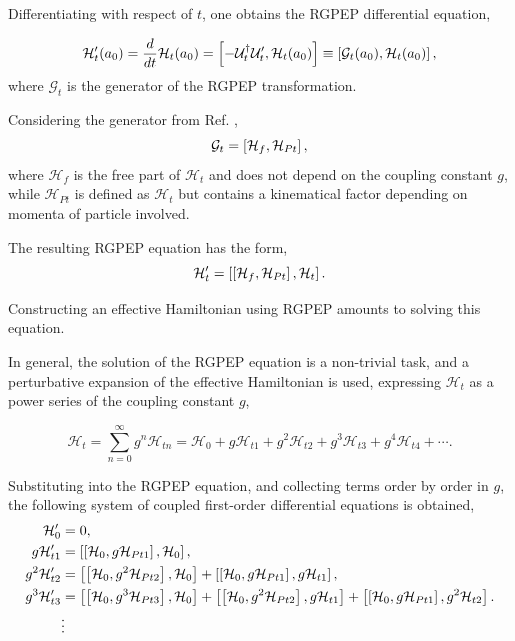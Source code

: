\documentclass[11pt,a4paper,twoside,pdf]{article}
\numberwithin{equation}{section}
\begin{document}
Differentiating with respect of $t$, one obtains the RGPEP differential equation,

\begin{equation}
    \mathcal{H}_t^\prime (a_0) = \frac{d}{dt}\mathcal{H}_t(a_0) = 
    \left[ -\mathcal{U}_t^\dagger \mathcal{U}_t^\prime, \mathcal{H}_t(a_0) \right] 
    \equiv \left[ \mathcal{G}_t(a_0), \mathcal{H}_t(a_0) \right],
\end{equation}
where $\mathcal{G}_t$ is the generator of the RGPEP transformation. 

Considering the generator from Ref. \cite{PEP},
\begin{equation}
    \mathcal{G}_t = \left[ \mathcal{H}_f, \mathcal{H}_{Pt} \right],
\end{equation}
where $\mathcal{H}_f$ is the free part of $\mathcal{H}_t$ and does not depend on 
the coupling constant \( g \), 
while $\mathcal{H}_{Pt}$ is defined as $\mathcal{H}_t$ but contains a kinematical factor
depending on momenta of particle involved.

The resulting RGPEP equation has the form,
\begin{equation}
    \mathcal{H}_t^\prime =  \left[ \left[ \mathcal{H}_f, \mathcal{H}_{Pt} \right], \mathcal{H}_t \right].
\end{equation}

Constructing an effective Hamiltonian using RGPEP amounts to solving this equation.

In general, the solution of the RGPEP equation is a non-trivial task, and a perturbative
expansion of the effective Hamiltonian is used, expressing  
$\mathcal{H}_t$ as a power series of the coupling constant $g$,

\begin{equation}
    \mathcal{H}_t = \sum_{n=0}^{\infty} g^n \mathcal{H}_{t n} = 
    \mathcal{H}_{0} + g \mathcal{H}_{t 1} + g^2 \mathcal{H}_{t 2} + g^3 \mathcal{H}_{t 3} +
    g^4 \mathcal{H}_{t 4} + \cdots.
\end{equation}

Substituting into the RGPEP equation, and collecting terms order by order in \( g \),
the following system of coupled first-order differential equations is obtained,
\begin{align}
        \mathcal{H}_{0}^\prime &= 0, \label{eq:diff_order0}\\
        g\mathcal{H}_{t 1}^\prime &= \left[ \left[ \mathcal{H}_0, g\mathcal{H}_{Pt 1} \right], 
        \mathcal{H}_{0} \right], \label{eq:diff_order1}\\
        g^2\mathcal{H}_{t 2}^\prime &= \left[ \left[ \mathcal{H}_0, g^2\mathcal{H}_{Pt 2} \right], 
        \mathcal{H}_{0} \right] + \left[ \left[ \mathcal{H}_0, g\mathcal{H}_{Pt 1} \right], 
        g\mathcal{H}_{t 1} \right], \\
        g^3\mathcal{H}_{t 3}^\prime &= \left[ \left[ \mathcal{H}_0, g^3\mathcal{H}_{Pt 3} \right], 
        \mathcal{H}_{0} \right] + \left[ \left[ \mathcal{H}_0, g^2\mathcal{H}_{Pt 2} \right], 
        g\mathcal{H}_{t 1} \right] + \left[ \left[ \mathcal{H}_0, g\mathcal{H}_{Pt 1} \right], 
        g^2\mathcal{H}_{t 2} \right]. \label{eq:diff_order3}\\
        &\vdots \nonumber
\end{align}
\end{document}
